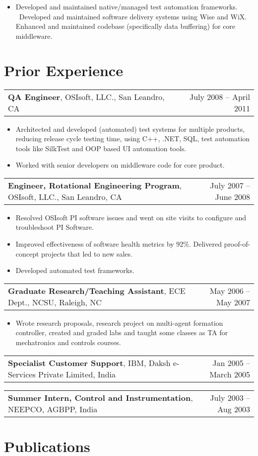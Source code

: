 \documentclass[letterpaper,10pt]{article}
\makeatletter
\newcommand{\experienceItem}[3]{
	\begin{tabular*}{\textwidth}{c@{\extracolsep{\fill}}c}
		\multicolumn{1}{l}{\textbf{#1}, #2} & \multicolumn{1}{r}{#3}\\
	\end{tabular*}\vspace{-10pt}
}
\newcommand{\resumeItemListStart}{\begin{itemize}}
\newcommand{\resumeItemListEnd}{\end{itemize}}
\newcommand{\resumeListItem}[1]{
	\item{#1 \vspace{-6pt}}
}
\makeatother
\begin{document}
	\resumeItemListStart
	\resumeListItem {Developed and maintained native/managed test automation frameworks. \ Developed and maintained software delivery systems using Wise and WiX. Enhanced and maintained codebase (specifically data buffering) for core middleware.}
	\resumeItemListEnd

	\section{Prior Experience}
	
	\experienceItem{QA Engineer}{OSIsoft, LLC., San Leandro, CA}{July 2008 -- April 2011}	
	\vspace{-8pt}
	\resumeItemListStart
	\resumeListItem {Architected and developed (automated) test systems for multiple products, reducing release cycle testing time, using C++, .NET, SQL, test automation tools like SilkTest and OOP based UI automation tools.}
	\resumeListItem {Worked with senior developers on middleware code for core product.}
	\resumeItemListEnd
	
	\experienceItem{Engineer, Rotational Engineering Program}{OSIsoft, LLC., San Leandro, CA}{July 2007 -- June 2008}
	\vspace{-8pt}	
	\resumeItemListStart
	\resumeListItem {Resolved OSIsoft PI software issues and went on site visits to configure and troubleshoot PI Software.}
	\resumeListItem {Improved effectiveness of software health metrics by 92\%. Delivered proof-of-concept projects that led to new sales.}
	\resumeListItem {Developed automated test frameworks.}
	\resumeItemListEnd
	
	\experienceItem{Graduate Research/Teaching Assistant}{ECE Dept., NCSU, Raleigh, NC}{May 2006 -- May 2007}
	\vspace{-8pt}
	\resumeItemListStart
	\resumeListItem {Wrote research proposals, research project on multi-agent formation controller, created and graded labs and taught some classes as TA for mechatronics and controls courses.}
	\resumeItemListEnd
	
	\experienceItem{Specialist Customer Support}{IBM, Daksh e-Services Private Limited, India}{Jan 2005 -- March 2005}
	
	\experienceItem{Summer Intern, Control and Instrumentation}{NEEPCO, AGBPP, India}{July 2003 -- Aug 2003}

	\section{Publications}
	
\end{document}

